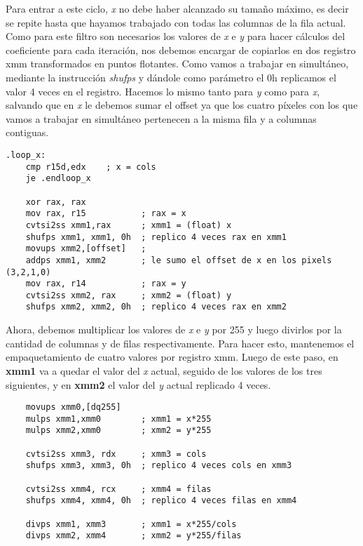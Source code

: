 \documentclass[a4paper]{article}
\begin{document}
\indent Para entrar a este ciclo, \emph{x} no debe haber alcanzado su tama\~no m\'aximo, es decir se repite hasta que hayamos trabajado con todas las columnas de la fila actual. Como para este filtro son necesarios los valores de \emph{x} e \emph{y} para hacer c\'alculos del coeficiente para cada iteraci\'on, nos debemos encargar de copiarlos en dos registro xmm transformados en puntos flotantes. Como vamos a trabajar en simult\'aneo, mediante la instrucci\'on \textit{shufps} y d\'andole como par\'ametro el 0h replicamos el valor 4 veces en el registro. Hacemos lo mismo tanto para \emph{y} como para \emph{x}, salvando que en \emph{x} le debemos sumar el offset ya que los cuatro p\'ixeles con los que vamos a trabajar en simult\'aneo pertenecen a la misma fila y a columnas contiguas. 
 \begin{codesnippet}
\begin{verbatim}
.loop_x:
    cmp r15d,edx    ; x = cols
    je .endloop_x

    xor rax, rax 
    mov rax, r15           ; rax = x
    cvtsi2ss xmm1,rax      ; xmm1 = (float) x
    shufps xmm1, xmm1, 0h  ; replico 4 veces rax en xmm1
    movups xmm2,[offset]   ; 
    addps xmm1, xmm2       ; le sumo el offset de x en los pixels (3,2,1,0)
    mov rax, r14           ; rax = y
    cvtsi2ss xmm2, rax     ; xmm2 = (float) y
    shufps xmm2, xmm2, 0h  ; replico 4 veces rax en xmm2
\end{verbatim}
\end{codesnippet}

\indent Ahora, debemos multiplicar los valores de \emph{x} e \emph{y} por 255 y luego divirlos por la cantidad de columnas y de filas respectivamente. Para hacer esto, mantenemos el empaquetamiento de cuatro valores por registro xmm. Luego de este paso, en \textbf{xmm1} va a quedar el valor del \emph{x} actual, seguido de los valores de los tres siguientes, y en \textbf{xmm2} el valor del \emph{y} actual replicado 4 veces.
 \begin{codesnippet}
\begin{verbatim}
    movups xmm0,[dq255]
    mulps xmm1,xmm0        ; xmm1 = x*255
    mulps xmm2,xmm0        ; xmm2 = y*255
    
    cvtsi2ss xmm3, rdx     ; xmm3 = cols  
    shufps xmm3, xmm3, 0h  ; replico 4 veces cols en xmm3

    cvtsi2ss xmm4, rcx     ; xmm4 = filas
    shufps xmm4, xmm4, 0h  ; replico 4 veces filas en xmm4

    divps xmm1, xmm3       ; xmm1 = x*255/cols
    divps xmm2, xmm4       ; xmm2 = y*255/filas
\end{verbatim}
\end{codesnippet}
\newpage
\end{document}

